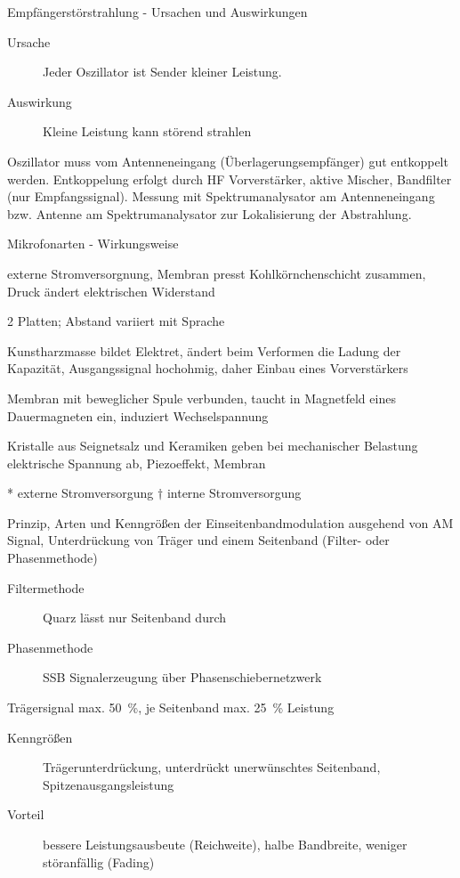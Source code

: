\documentclass[avery5371,grid,frame,a4paper]{flashcards}
\newcommand{\card}[3]{
  \begin{flashcard}[{\chap} -- #1]{#2}#3\end{flashcard}
}
\begin{document}
\card{43}{Empfängerstörstrahlung - Ursachen und Auswirkungen}{
  \begin{description}
    \item[Ursache]
      Jeder Oszillator ist Sender kleiner Leistung.
    \item[Auswirkung]
      Kleine Leistung kann störend strahlen
  \end{description}

  Oszillator muss vom Antenneneingang (Überlagerungsempfänger) gut entkoppelt werden.
  Entkoppelung erfolgt durch HF Vorverstärker, aktive Mischer, Bandfilter (nur Empfangssignal).
  Messung mit Spektrumanalysator am Antenneneingang bzw. Antenne am Spektrumanalysator zur Lokalisierung der Abstrahlung.
}
\card{44}{Mikrofonarten - Wirkungsweise}{
  \scriptsize
  \begin{description}
    \itemsep0pt
    \item[Kohlemikrofon*]
      externe Stromversorgnung,
      Membran presst Kohlkörnchenschicht zusammen,
      Druck ändert elektrischen Widerstand
    \item[Kondensatormikrofon*]
      2 Platten; Abstand variiert mit Sprache
    \item[Elektretmikrofon*]
      Kunstharzmasse bildet Elektret, ändert beim Verformen die Ladung der Kapazität,
      Ausgangssignal hochohmig, daher Einbau eines Vorverstärkers
    \tiny
    \item[Dynamisches Mikrofon$^\dagger$]
      Membran mit beweglicher Spule verbunden,
      taucht in Magnetfeld eines Dauermagneten ein,
      induziert Wechselspannung 
    \item[Kristallmikrofon$^\dagger$]
      Kristalle aus Seignetsalz und Keramiken geben bei mechanischer Belastung elektrische Spannung ab,
      Piezoeffekt, Membran
  \end{description}
  {\scriptsize
    * \quad externe Stromversorgung \quad
    $\dagger$ \quad interne Stromversorgung
  }
}
\card{45}{Prinzip, Arten und Kenngrößen der Einseitenbandmodulation}{
  \footnotesize
  ausgehend von AM Signal,
  Unterdrückung von Träger und einem Seitenband (Filter- oder Phasenmethode)

  \begin{description}
    \item[Filtermethode] Quarz lässt nur Seitenband durch
    \item[Phasenmethode] SSB Signalerzeugung über Phasenschiebernetzwerk
  \end{description}

  Trägersignal max. \SI{50}{\percent}, je Seitenband max. \SI{25}{\percent} Leistung

  \begin{description}
    \item[Kenngrößen] Trägerunterdrückung, unterdrückt unerwünschtes Seitenband, Spitzenausgangsleistung
    \item[Vorteil] bessere Leistungsausbeute (Reichweite), halbe Bandbreite, weniger störanfällig (Fading)
  \end{description}
}
\end{document}
